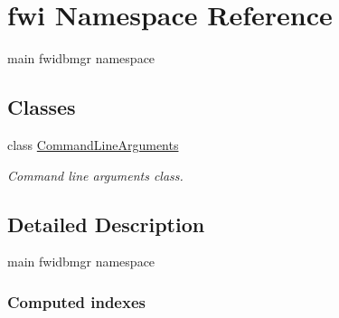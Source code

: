 \hypertarget{namespacefwi}{\section{fwi Namespace Reference}
\label{namespacefwi}
}


main fwidbmgr namespace  


\subsection*{Classes}
\begin{DoxyCompactItemize}
\item 
class \hyperlink{classfwi_1_1CommandLineArguments}{Command\-Line\-Arguments}
\begin{DoxyCompactList}\small\item\em Command line arguments class. \end{DoxyCompactList}\end{DoxyCompactItemize}


\subsection{Detailed Description}
main fwidbmgr namespace \subsubsection*{Computed indexes}


